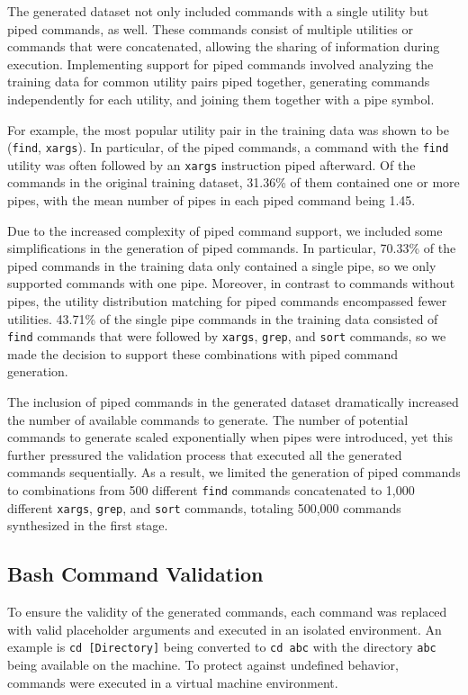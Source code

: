 \documentclass{river-journal}
\begin{document}
The generated dataset not only included commands with a single utility but piped commands, as well. These commands consist of multiple utilities or commands that were concatenated, allowing the sharing of information during execution. Implementing support for piped commands involved analyzing the training data for common utility pairs piped together, generating commands independently for each utility, and joining them together with a pipe symbol. 

For example, the most popular utility pair in the training data was shown to be (\texttt{find},  \texttt{xargs}). In particular, of the piped commands, a command with the \texttt{find} utility was often followed by an \texttt{xargs} instruction piped afterward. Of the commands in the original training dataset, 31.36\% of them contained one or more pipes, with the mean number of pipes in each piped command being 1.45.

Due to the increased complexity of piped command support, we included some simplifications in the generation of piped commands. In particular, 70.33\% of the piped commands in the training data only contained a single pipe, so we only supported commands with one pipe. Moreover, in contrast to commands without pipes, the utility distribution matching for piped commands encompassed fewer utilities. 43.71\% of the single pipe commands in the training data consisted of \texttt{find} commands that were followed by \texttt{xargs}, \texttt{grep}, and \texttt{sort} commands, so we made the decision to support these combinations with piped command generation.

The inclusion of piped commands in the generated dataset dramatically increased the number of available commands to generate. The number of potential commands to generate scaled exponentially when pipes were introduced, yet this further pressured the validation process that executed all the generated commands sequentially. As a result, we limited the generation of piped commands to combinations from 500 different \texttt{find} commands concatenated to 1,000 different \texttt{xargs}, \texttt{grep}, and \texttt{sort} commands, totaling 500,000 commands synthesized in the first stage.

\subsection{Bash Command Validation}

To ensure the validity of the generated commands, each command was replaced with valid placeholder arguments and executed in an isolated environment. An example is \texttt{cd [Directory]} being converted to \texttt{cd abc} with the directory \texttt{abc} being available on the machine. To protect against undefined behavior, commands were executed in a virtual machine environment. 
\end{document}
